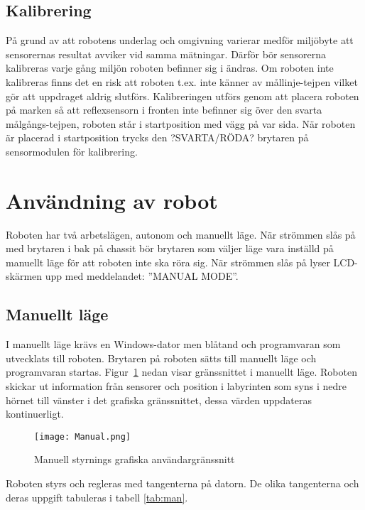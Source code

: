 \documentclass[11pt]{article}
\begin{document}
\subsection{Kalibrering}  
På grund av att robotens underlag och omgivning varierar medför miljöbyte att sensorernas resultat avviker vid samma mätningar. Därför bör sensorerna kalibreras varje gång miljön roboten befinner sig i ändras. Om roboten inte kalibreras finns det en risk att roboten t.ex. inte känner av mållinje-tejpen vilket gör att uppdraget aldrig slutförs. Kalibreringen utförs genom att placera roboten på marken så att reflexsensorn i fronten inte befinner sig över den svarta målgångs-tejpen, roboten står i startposition med vägg på var sida. När roboten är placerad i startposition trycks den ?SVARTA/RÖDA? brytaren på sensormodulen för kalibrering. 

\section{Användning av robot}
Roboten har två arbetslägen, autonom och manuellt läge. När strömmen slås på med brytaren i bak på chassit bör brytaren som väljer läge vara inställd på manuellt läge för att roboten inte ska röra sig. När strömmen slås på lyser LCD-skärmen upp med meddelandet: ”MANUAL MODE”.


\pagebreak

\subsection{Manuellt läge}
I manuellt läge krävs en Windows-dator men blåtand och programvaran som utvecklats till roboten. Brytaren på roboten sätts till manuellt läge och programvaran startas. Figur~\ref{fig:man} nedan visar gränssnittet i manuellt läge. Roboten skickar ut information från sensorer och position i labyrinten som syns i nedre hörnet till vänster i det grafiska gränssnittet, dessa värden uppdateras kontinuerligt. 


\begin{figure}[H]
\begin{center}
\texttt{[image: Manual.png]}
\caption{Manuell styrnings grafiska användargränssnitt}
\label{fig:man}
\end{center}
\end{figure}

Roboten styrs och regleras med tangenterna på datorn. De olika tangenterna och deras uppgift tabuleras i tabell \ref{tab:man}. 
\end{document}
